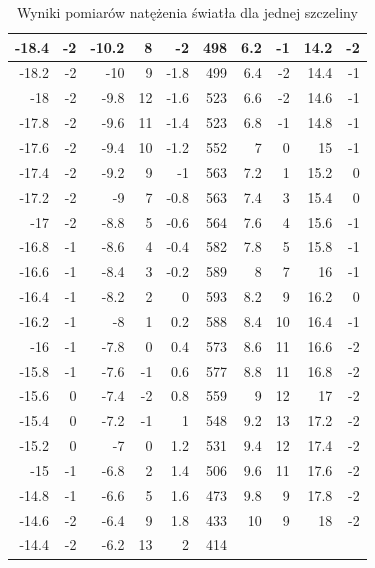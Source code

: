 \documentclass{article}
\begin{document}
\begin{table}[h!tbp]
\begin{tabular}{|r|r|r|r|r|r|r|r|r|r|}
-18.4 & -2 & -10.2 & 8 & -2 & 498 & 6.2 & -1 & 14.2 & -2 \\ \hline
-18.2 & -2 & -10 & 9 & -1.8 & 499 & 6.4 & -2 & 14.4 & -1 \\ \hline
-18 & -2 & -9.8 & 12 & -1.6 & 523 & 6.6 & -2 & 14.6 & -1 \\ \hline
-17.8 & -2 & -9.6 & 11 & -1.4 & 523 & 6.8 & -1 & 14.8 & -1 \\ \hline
-17.6 & -2 & -9.4 & 10 & -1.2 & 552 & 7 & 0 & 15 & -1 \\ \hline
-17.4 & -2 & -9.2 & 9 & -1 & 563 & 7.2 & 1 & 15.2 & 0 \\ \hline
-17.2 & -2 & -9 & 7 & -0.8 & 563 & 7.4 & 3 & 15.4 & 0 \\ \hline
-17 & -2 & -8.8 & 5 & -0.6 & 564 & 7.6 & 4 & 15.6 & -1 \\ \hline
-16.8 & -1 & -8.6 & 4 & -0.4 & 582 & 7.8 & 5 & 15.8 & -1 \\ \hline
-16.6 & -1 & -8.4 & 3 & -0.2 & 589 & 8 & 7 & 16 & -1 \\ \hline
-16.4 & -1 & -8.2 & 2 & 0 & 593 & 8.2 & 9 & 16.2 & 0 \\ \hline
-16.2 & -1 & -8 & 1 & 0.2 & 588 & 8.4 & 10 & 16.4 & -1 \\ \hline
-16 & -1 & -7.8 & 0 & 0.4 & 573 & 8.6 & 11 & 16.6 & -2 \\ \hline
-15.8 & -1 & -7.6 & -1 & 0.6 & 577 & 8.8 & 11 & 16.8 & -2 \\ \hline
-15.6 & 0 & -7.4 & -2 & 0.8 & 559 & 9 & 12 & 17 & -2 \\ \hline
-15.4 & 0 & -7.2 & -1 & 1 & 548 & 9.2 & 13 & 17.2 & -2 \\ \hline
-15.2 & 0 & -7 & 0 & 1.2 & 531 & 9.4 & 12 & 17.4 & -2 \\ \hline
-15 & -1 & -6.8 & 2 & 1.4 & 506 & 9.6 & 11 & 17.6 & -2 \\ \hline
-14.8 & -1 & -6.6 & 5 & 1.6 & 473 & 9.8 & 9 & 17.8 & -2 \\ \hline
-14.6 & -2 & -6.4 & 9 & 1.8 & 433 & 10 & 9 & 18 & -2 \\ \hline
-14.4 & -2 & -6.2 & 13 & 2 & 414 & \multicolumn{1}{l|}{} & \multicolumn{1}{l|}{} & \multicolumn{1}{l|}{} & \multicolumn{1}{l|}{} \\ \hline
\end{tabular}
\caption{Wyniki pomiarów natężenia światła dla jednej szczeliny}
\label{}
\end{table}


\clearpage

\end{document}
